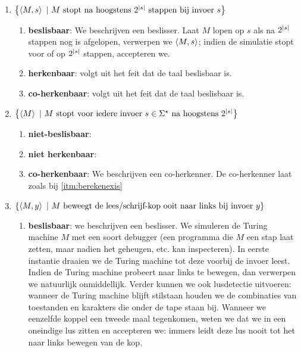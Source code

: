 \documentclass{article}
\begin{document}
\begin{question}[Berekenbaarheid]
\begin{answer}
\begin{enumerate}
\begin{enumerate}
 \end{enumerate}
 \item $\left\{ \left\langle M,s \right\rangle\ |\ \mbox{$M$ stopt na hoogstens $2^{\left|s\right|}$ stappen bij invoer $s$} \right\}$
 \begin{enumerate}
  \item \textbf{beslisbaar}: We beschrijven een beslisser. Laat $M$ lopen op $s$ als na $2^{\left|s\right|}$ stappen nog is afgelopen, verwerpen we $\left\langle M,s \right\rangle$; indien de simulatie stopt voor of op $2^{\left|s\right|}$ stappen, accepteren we.
  \item \textbf{herkenbaar}: volgt uit het feit dat de taal beslisbaar is.
  \item \textbf{co-herkenbaar}: volgt uit het feit dat de taal beslisbaar is.
 \end{enumerate}
 \item $\left\{ \left\langle M \right\rangle\ |\ \mbox{$M$ stopt voor iedere invoer $s\in\Sigma^{\star}$ na hoogstens $2^{\left|s\right|}$} \right\}$
 \begin{enumerate}
  \item \textbf{niet-beslisbaar}: 
  \item \textbf{niet herkenbaar}: 
  \item \textbf{co-herkenbaar}: We beschrijven een co-herkenner. De co-herkenner laat zoals bij \ref{itm:berekenexis} 
 \end{enumerate}
 \item $\left\{ \left\langle M,y \right\rangle\ |\ \mbox{$M$ beweegt de lees/schrijf-kop ooit naar links bij invoer $y$} \right\}$
 \begin{enumerate}
  \item \textbf{beslisbaar}: we beschrijven een beslisser. We simuleren de Turing machine $M$ met een soort debugger (een programma die $M$ een stap laat zetten, maar nadien het geheugen, etc. kan inspecteren). In eerste instantie draaien we de Turing machine tot deze voorbij de invoer leest. Indien de Turing machine probeert naar links te bewegen, dan verwerpen we natuurlijk onmiddellijk. Verder kunnen we ook lusdetectie uitvoeren: wanneer de Turing machine blijft stilstaan houden we de combinaties van toestanden en karakters die onder de tape staan bij. Wanneer we eenzelfde koppel een tweede maal tegenkomen, weten we dat we in een oneindige lus zitten en accepteren we: immers leidt deze lus nooit tot het naar links bewegen van de kop.

\end{enumerate}
\end{enumerate}
\end{answer}
\end{question}
\end{document}
